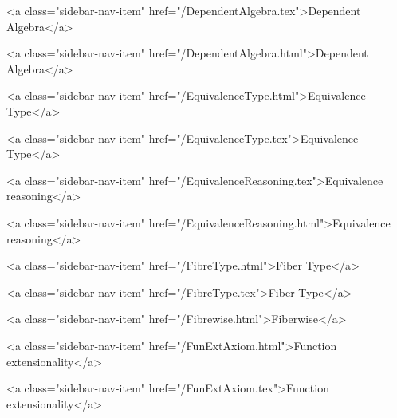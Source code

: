       
        
          <a class="sidebar-nav-item" href="/DependentAlgebra.tex">Dependent Algebra</a>
        
      
    
      
        
          <a class="sidebar-nav-item" href="/DependentAlgebra.html">Dependent Algebra</a>
        
      
    
      
        
          <a class="sidebar-nav-item" href="/EquivalenceType.html">Equivalence Type</a>
        
      
    
      
        
          <a class="sidebar-nav-item" href="/EquivalenceType.tex">Equivalence Type</a>
        
      
    
      
        
          <a class="sidebar-nav-item" href="/EquivalenceReasoning.tex">Equivalence reasoning</a>
        
      
    
      
        
          <a class="sidebar-nav-item" href="/EquivalenceReasoning.html">Equivalence reasoning</a>
        
      
    
      
        
          <a class="sidebar-nav-item" href="/FibreType.html">Fiber Type</a>
        
      
    
      
        
          <a class="sidebar-nav-item" href="/FibreType.tex">Fiber Type</a>
        
      
    
      
        
          <a class="sidebar-nav-item" href="/Fibrewise.html">Fiberwise</a>
        
      
    
      
        
          <a class="sidebar-nav-item" href="/FunExtAxiom.html">Function extensionality</a>
        
      
    
      
        
          <a class="sidebar-nav-item" href="/FunExtAxiom.tex">Function extensionality</a>
        
